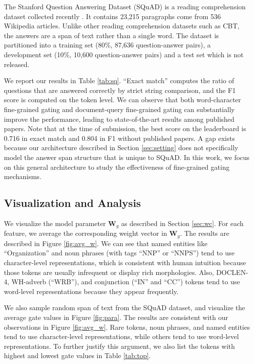 \documentclass{article} \usepackage{iclr2017_conference,times}
\begin{document}
The Stanford Question Answering Dataset (SQuAD) is a reading comprehension dataset collected recently \citep{pranav2016squad}. It contains 23,215 paragraphs come from 536 Wikipedia articles.
Unlike other reading comprehension datasets such as CBT, the answers are a span of text rather than a single word.
The dataset is partitioned into a training set (80\%, 87,636 question-answer pairs), a development set (10\%, 10,600 question-answer pairs) and a test set which is not released.


We report our results in Table \ref{tab:sq}. ``Exact match'' computes the ratio of questions that are answered correctly by strict string comparison, and the F1 score is computed on the token level. We can observe that both word-character fine-grained gating and document-query fine-grained gating can substantially improve the performance, leading to state-of-the-art results among published papers. Note that at the time of submission, the best score on the leaderboard is 0.716 in exact match and 0.804 in F1 without published papers. A gap exists because our architecture described in Section \ref{sec:setting} does not specifically model the answer span structure that is unique to SQuAD.
In this work, we focus on this general architecture to study the effectiveness of fine-grained gating mechanisms.

\subsection{Visualization and Analysis}

We visualize the model parameter $\mathbf{W}_g$ as described in Section \ref{sec:wc}. For each feature, we average the corresponding weight vector in $\mathbf{W}_g$. The results are described in Figure \ref{fig:avg_w}. We can see that named entities like ``Organization'' and noun phrases (with tags ``NNP'' or ``NNPS'') tend to use character-level representations, which is consistent with human intuition because those tokens are usually infrequent or display rich morphologies. Also, DOCLEN-4, WH-adverb (``WRB''), and conjunction (``IN'' and ``CC'') tokens tend to use word-level representations because they appear frequently.

We also sample random span of text from the SQuAD dataset, and visualize the average gate values in Figure \ref{fig:para}. The results are consistent with our observations in Figure \ref{fig:avg_w}. Rare tokens, noun phrases, and named entities tend to use character-level representations, while others tend to use word-level representations. To further justify this argument, we also list the tokens with highest and lowest gate values in Table \ref{tab:top}.
\end{document}
